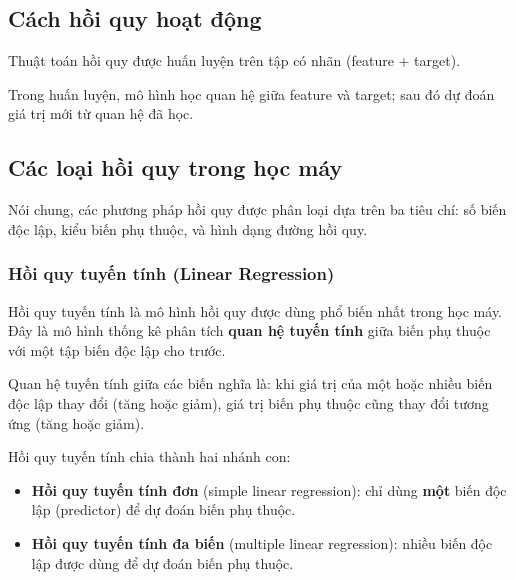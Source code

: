 \subsection{Cách hồi quy hoạt động}

\begin{phuongphap}[title={Quy trình}]
Thuật toán hồi quy được huấn luyện trên tập có nhãn (feature + target).

Trong huấn luyện, mô hình học quan hệ giữa feature và target; sau đó dự đoán giá trị mới từ quan hệ đã học.
\end{phuongphap}

\subsection{Các loại hồi quy trong học máy}

\begin{phuongphap}[title={Cách phân loại và các loại thường dùng}]
Nói chung, các phương pháp hồi quy được phân loại dựa trên ba tiêu chí: số biến độc lập, kiểu biến phụ thuộc, và hình dạng đường hồi quy.
\end{phuongphap}

\subsubsection{Hồi quy tuyến tính (Linear Regression)}

\begin{dinhnghia}[title={Hồi quy tuyến tính}]
Hồi quy tuyến tính là mô hình hồi quy được dùng phổ biến nhất trong học máy.
Đây là mô hình thống kê phân tích \textbf{quan hệ tuyến tính} giữa biến phụ thuộc với một tập biến độc lập cho trước.
\end{dinhnghia}

\begin{phuongphap}[title={Quan hệ tuyến tính và hai nhánh}]
Quan hệ tuyến tính giữa các biến nghĩa là: khi giá trị của một hoặc nhiều biến độc lập thay đổi (tăng hoặc giảm), giá trị biến phụ thuộc cũng thay đổi tương ứng (tăng hoặc giảm).

Hồi quy tuyến tính chia thành hai nhánh con:
\begin{itemize}
  \item \textbf{Hồi quy tuyến tính đơn} (simple linear regression): chỉ dùng \textbf{một} biến độc lập (predictor) để dự đoán biến phụ thuộc.
  \item \textbf{Hồi quy tuyến tính đa biến} (multiple linear regression): nhiều biến độc lập được dùng để dự đoán biến phụ thuộc.
\end{itemize}
\end{phuongphap}

